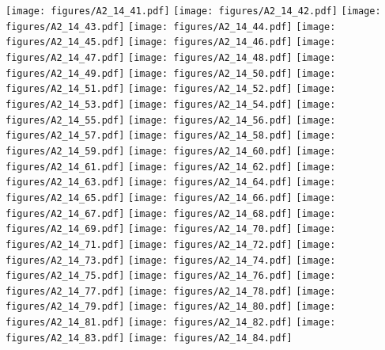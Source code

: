 \documentclass[12pt,a4paper]{article}
\begin{document}
\texttt{[image: figures/A2\_14\_41.pdf]}
\texttt{[image: figures/A2\_14\_42.pdf]}
\texttt{[image: figures/A2\_14\_43.pdf]}
\texttt{[image: figures/A2\_14\_44.pdf]}
\texttt{[image: figures/A2\_14\_45.pdf]}
\texttt{[image: figures/A2\_14\_46.pdf]}
\texttt{[image: figures/A2\_14\_47.pdf]}
\texttt{[image: figures/A2\_14\_48.pdf]}
\texttt{[image: figures/A2\_14\_49.pdf]}
\texttt{[image: figures/A2\_14\_50.pdf]}
\texttt{[image: figures/A2\_14\_51.pdf]}
\texttt{[image: figures/A2\_14\_52.pdf]}
\texttt{[image: figures/A2\_14\_53.pdf]}
\texttt{[image: figures/A2\_14\_54.pdf]}
\texttt{[image: figures/A2\_14\_55.pdf]}
\texttt{[image: figures/A2\_14\_56.pdf]}
\texttt{[image: figures/A2\_14\_57.pdf]}
\texttt{[image: figures/A2\_14\_58.pdf]}
\texttt{[image: figures/A2\_14\_59.pdf]}
\texttt{[image: figures/A2\_14\_60.pdf]}
\texttt{[image: figures/A2\_14\_61.pdf]}
\texttt{[image: figures/A2\_14\_62.pdf]}
\texttt{[image: figures/A2\_14\_63.pdf]}
\texttt{[image: figures/A2\_14\_64.pdf]}
\texttt{[image: figures/A2\_14\_65.pdf]}
\texttt{[image: figures/A2\_14\_66.pdf]}
\texttt{[image: figures/A2\_14\_67.pdf]}
\texttt{[image: figures/A2\_14\_68.pdf]}
\texttt{[image: figures/A2\_14\_69.pdf]}
\texttt{[image: figures/A2\_14\_70.pdf]}
\texttt{[image: figures/A2\_14\_71.pdf]}
\texttt{[image: figures/A2\_14\_72.pdf]}
\texttt{[image: figures/A2\_14\_73.pdf]}
\texttt{[image: figures/A2\_14\_74.pdf]}
\texttt{[image: figures/A2\_14\_75.pdf]}
\texttt{[image: figures/A2\_14\_76.pdf]}
\texttt{[image: figures/A2\_14\_77.pdf]}
\texttt{[image: figures/A2\_14\_78.pdf]}
\texttt{[image: figures/A2\_14\_79.pdf]}
\texttt{[image: figures/A2\_14\_80.pdf]}
\texttt{[image: figures/A2\_14\_81.pdf]}
\texttt{[image: figures/A2\_14\_82.pdf]}
\texttt{[image: figures/A2\_14\_83.pdf]}
\texttt{[image: figures/A2\_14\_84.pdf]}
\end{document}
